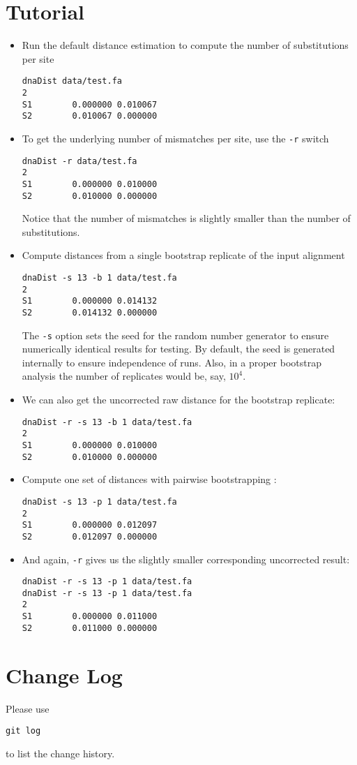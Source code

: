 \documentclass[a4paper, english]{article}
\newcommand{\ty}{\texttt}
\begin{document}
\section{Tutorial}
\begin{itemize}
\item Run the default distance estimation to compute the number of
  substitutions per site
\begin{verbatim}
dnaDist data/test.fa 
2
S1        0.000000 0.010067
S2        0.010067 0.000000
\end{verbatim}
\item To get the underlying number of mismatches
  per site, use the \ty{-r} switch
\begin{verbatim}
dnaDist -r data/test.fa 
2
S1        0.000000 0.010000
S2        0.010000 0.000000
\end{verbatim}
Notice that the number of mismatches is slightly smaller than the
number of substitutions.
\item Compute distances from a single bootstrap replicate of the input alignment \citep{fel85:con}
\begin{verbatim}
dnaDist -s 13 -b 1 data/test.fa 
2
S1        0.000000 0.014132
S2        0.014132 0.000000
\end{verbatim}
The \ty{-s} option sets the seed for the random number generator to
ensure numerically identical results for testing. By default, the seed
is generated internally to ensure independence of runs. Also, in a
proper bootstrap analysis the number of replicates would be, say,
$10^4$.
\item We can also get the uncorrected raw distance for the bootstrap
  replicate:
\begin{verbatim}
dnaDist -r -s 13 -b 1 data/test.fa 
2
S1        0.000000 0.010000
S2        0.010000 0.000000
\end{verbatim}
\item Compute one set of distances with pairwise bootstrapping
  \citep{klo16:sup}:
\begin{verbatim}
dnaDist -s 13 -p 1 data/test.fa 
2
S1        0.000000 0.012097
S2        0.012097 0.000000
\end{verbatim}
\item And again, \ty{-r} gives us the slightly smaller corresponding
  uncorrected result:
\begin{verbatim}
dnaDist -r -s 13 -p 1 data/test.fa 
dnaDist -r -s 13 -p 1 data/test.fa 
2
S1        0.000000 0.011000
S2        0.011000 0.000000
\end{verbatim}
\end{itemize}

\section{Change Log}
Please use
\begin{verbatim}
git log
\end{verbatim}
to list the change history.


\end{document}
